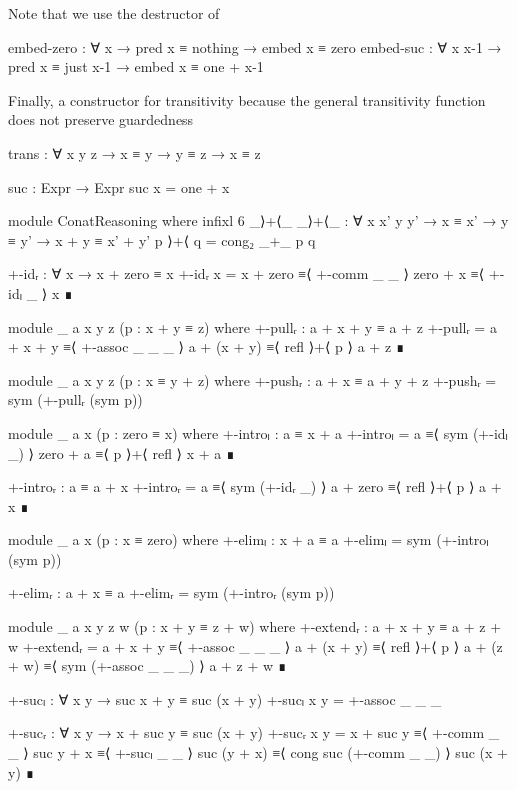 Note that we use the destructor  of 
\begin{code}
    embed-zero : ∀ x → pred x ≡ nothing → embed x ≡ zero
    embed-suc : ∀ x x-1 → pred x ≡ just x-1 → embed x ≡ one + x-1
\end{code}
Finally, a constructor for transitivity because the general transitivity
function does not preserve guardedness
\begin{code}
    trans : ∀ {x y z} → x ≡ y → y ≡ z → x ≡ z
\end{code}
\begin{code}[hide]
  suc : Expr → Expr
  suc x = one + x

  module ConatReasoning where
    infixl 6 _⟩+⟨_
    _⟩+⟨_ : ∀ {x x' y y'} → x ≡ x' → y ≡ y' → x + y ≡ x' + y'
    p ⟩+⟨ q = cong₂ _+_ p q

    +-idᵣ : ∀ x → x + zero ≡ x
    +-idᵣ x =
      x + zero ≡⟨ +-comm _ _ ⟩
      zero + x ≡⟨ +-idₗ _ ⟩
      x        ∎

    module _ {a x y z} (p : x + y ≡ z) where
      +-pullᵣ : a + x + y ≡ a + z
      +-pullᵣ =
        a + x + y   ≡⟨ +-assoc _ _ _ ⟩
        a + (x + y) ≡⟨ refl ⟩+⟨ p ⟩
        a + z       ∎

    module _ {a x y z} (p : x ≡ y + z) where
      +-pushᵣ : a + x ≡ a + y + z
      +-pushᵣ = sym (+-pullᵣ (sym p))

    module _ {a x} (p : zero ≡ x) where
      +-introₗ : a ≡ x + a
      +-introₗ =
        a        ≡⟨ sym (+-idₗ _) ⟩
        zero + a ≡⟨ p ⟩+⟨ refl ⟩
        x + a    ∎

      +-introᵣ : a ≡ a + x
      +-introᵣ =
        a        ≡⟨ sym (+-idᵣ _) ⟩
        a + zero ≡⟨ refl ⟩+⟨ p ⟩
        a + x    ∎

    module _ {a x} (p : x ≡ zero) where
      +-elimₗ : x + a ≡ a
      +-elimₗ = sym (+-introₗ (sym p))

      +-elimᵣ : a + x ≡ a
      +-elimᵣ = sym (+-introᵣ (sym p))

    module _ {a x y z w} (p : x + y ≡ z + w) where
      +-extendᵣ : a + x + y ≡ a + z + w
      +-extendᵣ =
        a + x + y   ≡⟨ +-assoc _ _ _ ⟩
        a + (x + y) ≡⟨ refl ⟩+⟨ p ⟩
        a + (z + w) ≡⟨ sym (+-assoc _ _ _) ⟩
        a + z + w   ∎

    +-sucₗ : ∀ x y → suc x + y ≡ suc (x + y)
    +-sucₗ x y = +-assoc _ _ _

    +-sucᵣ : ∀ x y → x + suc y ≡ suc (x + y)
    +-sucᵣ x y =
      x + suc y   ≡⟨ +-comm _ _ ⟩
      suc y + x   ≡⟨ +-sucₗ _ _ ⟩
      suc (y + x) ≡⟨ cong suc (+-comm _ _) ⟩
      suc (x + y) ∎


\end{code}
